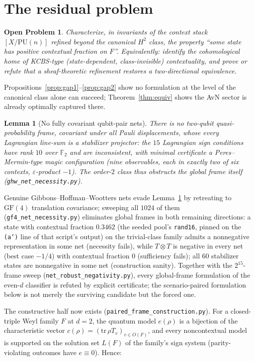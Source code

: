 \documentclass[11pt]{article}
\newtheorem{openproblem}{Open Problem}
\newtheorem{lemma}{Lemma}
\theoremstyle{remark}
\theoremstyle{plain}
\newcommand{\PU}{\mathrm{PU}}
\begin{document}
\section{The residual problem}
\begin{openproblem}\label{op}
Characterize, in invariants of the context stack $[X/\PU(n)]$ refined beyond the
canonical $H^2$ class, the property ``some state has positive contextual fraction on
$F$''. Equivalently: identify the cohomological home of KCBS-type (state-dependent,
class-invisible) contextuality, and prove or refute that a sheaf-theoretic refinement
restores a two-directional equivalence.
\end{openproblem}
Propositions~\ref{prop:gap1}--\ref{prop:gap2} show no formulation at the level of the
canonical class alone can succeed; Theorem~\ref{thm:equiv} shows the AvN sector is
already optimally captured there.

\begin{lemma}[No fully covariant qubit-pair nets]\label{lem:nonet}
There is no two-qubit quasi-probability frame, covariant under all Pauli displacements,
whose every Lagrangian line-sum is a stabilizer projector: the $15$ Lagrangian sign
conditions have rank $10$ over $\mathbb{F}_2$ and are inconsistent, with minimal
certificate a Peres--Mermin-type magic configuration (nine observables, each in exactly
two of six contexts, $\varepsilon$-product $-1$). The order-$2$ class thus obstructs the
global frame itself (\texttt{ghw\_net\_necessity.py}).
\end{lemma}

Genuine Gibbons--Hoffman--Wootters nets evade Lemma~\ref{lem:nonet} by retreating to
$\mathrm{GF}(4)$ translation covariance; sweeping all $1024$ of them
(\texttt{gf4\_net\_necessity.py}) eliminates global frames in both remaining directions:
a state with contextual fraction $0.3462$ (the seeded pool's \texttt{rand16}, pinned on
the \texttt{(a')} line of that script's output) on the trivial-class family admits a
nonnegative representation in some net (necessity fails), while $T\otimes T$ is negative
in every net (best case $-1/4$) with contextual fraction $0$ (sufficiency fails); all
$60$ stabilizer states are nonnegative in some net (construction sanity). Together with
the $2^{15}$-frame sweep (\texttt{net\_robust\_negativity.py}), every global-frame
formulation of the even-$d$ classifier is refuted by explicit certificate; the
scenario-paired formulation below is not merely the surviving candidate but the forced one.

The constructive half now exists (\texttt{paired\_frame\_construction.py}). For a
closed-triple Weyl family $F$ at $d=2$, the quantum model $e(\rho)$ is a bijection of the
characteristic vector $c(\rho)=(\mathrm{tr}\,\rho T_v)_{v\in O(F)}$, and every
noncontextual model is supported on the solution set $L(F)$ of the family's sign system
(parity-violating outcomes have $e\equiv 0$). Hence:
\end{document}
